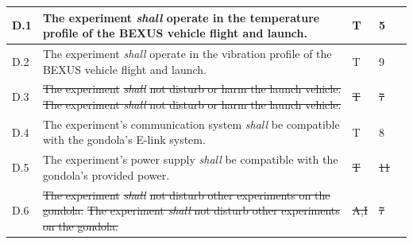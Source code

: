 \documentclass[a4paper,12pt,twoside]{article}
\providecommand{\DIFaddtex}[1]{{\protect\color{blue}\uwave{#1}}} %
\providecommand{\DIFdeltex}[1]{{\protect\color{red}\sout{#1}}}                      %
\providecommand{\DIFaddbegin}{} %
\providecommand{\DIFaddend}{} %
\providecommand{\DIFdelbegin}{} %
\providecommand{\DIFdelend}{} %
\providecommand{\DIFadd}[1]{\texorpdfstring{\DIFaddtex{#1}}{#1}} %
\providecommand{\DIFdel}[1]{\texorpdfstring{\DIFdeltex{#1}}{}} %
\newcommand{\DIFscaledelfig}{0.5}
\newlength{\DIFdelgraphicswidth} %
\newlength{\DIFdelgraphicsheight} %
\newcommand{\DIFaddincludegraphics}[2][]{{\color{blue}\fbox{\DIFOincludegraphics[#1]{#2}}}} %
\newcommand{\DIFdelincludegraphics}[2][]{%
\sbox{\DIFdelgraphicsbox}{\DIFOincludegraphics[#1]{#2}}%
\settoboxwidth{\DIFdelgraphicswidth}{\DIFdelgraphicsbox} %
\settoboxtotalheight{\DIFdelgraphicsheight}{\DIFdelgraphicsbox} %
\scalebox{\DIFscaledelfig}{%
\parbox[b]{\DIFdelgraphicswidth}{\usebox{\DIFdelgraphicsbox}\\[-\baselineskip] \rule{\DIFdelgraphicswidth}{0em}}\llap{\resizebox{\DIFdelgraphicswidth}{\DIFdelgraphicsheight}{%
\setlength{\unitlength}{\DIFdelgraphicswidth}%
\begin{picture}(1,1)%
\thicklines\linethickness{2pt} %
{\color[rgb]{1,0,0}\put(0,0){\framebox(1,1){}}}%
{\color[rgb]{1,0,0}\put(0,0){\line( 1,1){1}}}%
{\color[rgb]{1,0,0}\put(0,1){\line(1,-1){1}}}%
\end{picture}%
}\hspace*{3pt}}} %
} %
\DeclareRobustCommand{\DIFaddbegin}{\DIFOaddbegin \let\includegraphics\DIFaddincludegraphics} %
\DeclareRobustCommand{\DIFaddend}{\DIFOaddend \let\includegraphics\DIFOincludegraphics} %
\DeclareRobustCommand{\DIFdelbegin}{\DIFOdelbegin \let\includegraphics\DIFdelincludegraphics} %
\DeclareRobustCommand{\DIFdelend}{\DIFOaddend \let\includegraphics\DIFOincludegraphics} %
\begin{document}
\begin{longtable}[]{|m{}| m{} |m{} |m{}|m{}|}
\DIFaddend D.1  & The experiment \textit{shall} operate in the temperature profile of the BEXUS vehicle flight and launch.                                                                         &       \DIFaddbegin \DIFadd{A, }\DIFaddend T       & 5            &        \\ \hline
D.2  & The experiment \textit{shall} operate in the vibration profile of the BEXUS vehicle flight and launch.                                                                           &       \DIFaddbegin \DIFadd{A, }\DIFaddend T       & 9            &        \\ \hline
D.3  & \DIFdelbegin \DIFdel{The experiment }\textit{\DIFdel{shall}} %
\DIFdel{not disturb or harm the launch vehicle.                                                                                                            }\DIFdelend \DIFaddbegin \st{The experiment \textit{shall} not disturb or harm the launch vehicle.}\DIFadd{\textsuperscript{\ref{fn:unnecessary-requirement}}                                                                                                             }\DIFaddend &      \DIFdelbegin \DIFdel{T        }\DIFdelend \DIFaddbegin \DIFadd{-      }\DIFaddend & \DIFdelbegin \DIFdel{7            }\DIFdelend \DIFaddbegin \DIFadd{-          }\DIFaddend &        \\ \hline
D.4  & The experiment's communication system \textit{shall} be compatible with the gondola's E-link system.                                                                             &      \DIFaddbegin \DIFadd{A, }\DIFaddend T        & 8            &        \\ \hline
D.5  & The experiment's power supply \textit{shall
} be compatible with the gondola's provided power.                                                                                    &      \DIFdelbegin \DIFdel{T        }\DIFdelend \DIFaddbegin \DIFadd{A        }\DIFaddend &  \DIFdelbegin \DIFdel{11           }\DIFdelend \DIFaddbegin \DIFadd{-           }\DIFaddend &        \\ \hline
D.6  & \DIFdelbegin \DIFdel{The experiment }\textit{\DIFdel{shall}} %
\DIFdel{not disturb other experiments on the gondola.                                                                                                      }\DIFdelend \DIFaddbegin \st{The experiment \textit{shall} not disturb other experiments on the gondola.}\DIFadd{\textsuperscript{\ref{fn:unnecessary-requirement}}                                                                                                       }\DIFaddend &      \DIFdelbegin \DIFdel{A,I       }\DIFdelend \DIFaddbegin \DIFadd{-      }\DIFaddend & \DIFdelbegin \DIFdel{7            }\DIFdelend \DIFaddbegin \DIFadd{-           }\DIFaddend &        \\ \hline

\end{longtable}
\end{document}
